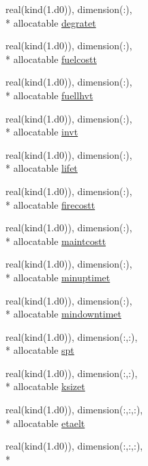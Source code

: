 \begin{DoxyCompactItemize}
\item 
real(kind(1.d0)), dimension(\-:), \\*
allocatable \hyperlink{classinputvar_ac55cb9b2b78bb635b7083a15b40013e1}{degratet}
\item 
real(kind(1.d0)), dimension(\-:), \\*
allocatable \hyperlink{classinputvar_ad2ccd9c466f57cca3096b20a6492b453}{fuelcostt}
\item 
real(kind(1.d0)), dimension(\-:), \\*
allocatable \hyperlink{classinputvar_a0fafd66a5d231ffafe01ff620004eb65}{fuellhvt}
\item 
real(kind(1.d0)), dimension(\-:), \\*
allocatable \hyperlink{classinputvar_abe7ea839b7f1cd20925aa7e709396529}{invt}
\item 
real(kind(1.d0)), dimension(\-:), \\*
allocatable \hyperlink{classinputvar_ae41d245ccd35c2cc156a128bd2ecfb3c}{lifet}
\item 
real(kind(1.d0)), dimension(\-:), \\*
allocatable \hyperlink{classinputvar_ac4f3966035d1de814f32b69c620c75a0}{firecostt}
\item 
real(kind(1.d0)), dimension(\-:), \\*
allocatable \hyperlink{classinputvar_a59115307b83bfd1c0b1652c091e20b62}{maintcostt}
\item 
real(kind(1.d0)), dimension(\-:), \\*
allocatable \hyperlink{classinputvar_a1e617330959313dade0696c66ae235cf}{minuptimet}
\item 
real(kind(1.d0)), dimension(\-:), \\*
allocatable \hyperlink{classinputvar_a80329f2c6a6631a2c21fadb194436b7c}{mindowntimet}
\item 
real(kind(1.d0)), dimension(\-:,\-:), \\*
allocatable \hyperlink{classinputvar_aea96dbeef4023d78701a4f3821152d1d}{spt}
\item 
real(kind(1.d0)), dimension(\-:,\-:), \\*
allocatable \hyperlink{classinputvar_a359d19cae6373fc1cdfff9739977c075}{ksizet}
\item 
real(kind(1.d0)), dimension(\-:,\-:,\-:), \\*
allocatable \hyperlink{classinputvar_a369a3060de992f175783133d4a467699}{etaelt}
\item 
real(kind(1.d0)), dimension(\-:,\-:,\-:), \\*

\end{DoxyCompactItemize}
